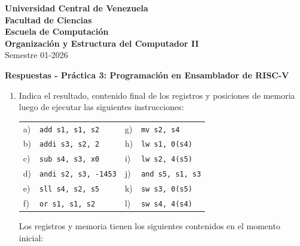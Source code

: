 \documentclass[letterpaper,12pt]{article}
\begin{document}

\noindent \textbf{Universidad Central de Venezuela}\\
\textbf{Facultad de Ciencias}\\
\textbf{Escuela de Computación}\\
\textbf{Organización y Estructura del Computador II}\\
Semestre 01-2026

\vspace{0.3cm}
\begin{center}
{\textbf{Respuestas - Práctica 3: Programación en Ensamblador de RISC-V}}
\end{center}
\vspace{0.5cm}


\begin{enumerate}

    \item Indica el resultado, contenido final de los registros y posiciones de memoria luego de ejecutar las siguientes instrucciones:
    \vspace{0.3cm}
    
    \begin{tabular}{ll@{\hspace{2.5cm}}ll}
        a) & \texttt{add s1, s1, s2} & g) & \texttt{mv s2, s4} \\
        b) & \texttt{addi s3, s2, 2} & h) & \texttt{lw s1, 0(s4)} \\
        c) & \texttt{sub s4, s3, x0} & i) & \texttt{lw s2, 4(s5)} \\
        d) & \texttt{andi s2, s3, -1453} & j) & \texttt{and s5, s1, s3} \\
        e) & \texttt{sll s4, s2, s5} & k) & \texttt{sw s3, 0(s5)} \\
        f) & \texttt{or s1, s1, s2} & l) & \texttt{sw s4, 4(s4)}
    \end{tabular}
    
    \vspace{0.5cm}
    Los registros y memoria tienen los siguientes contenidos en el momento inicial:
    \vspace{0.3cm}


\end{enumerate}
\end{document}
